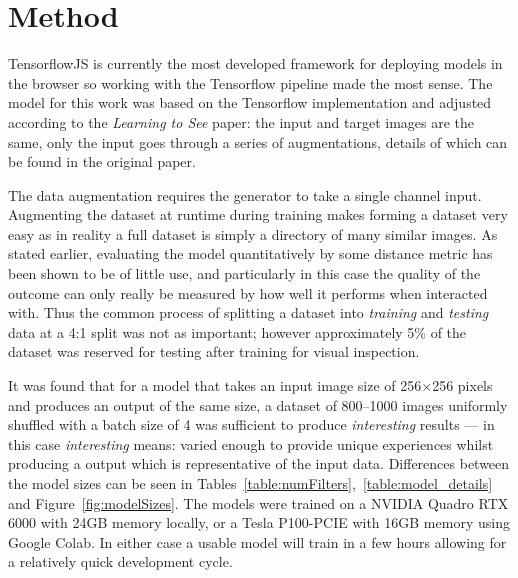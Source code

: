 \documentclass{article}
\begin{document}
\section{Method}
TensorflowJS is currently the most developed framework for deploying models in the browser so working with the Tensorflow pipeline made the most sense. The model for this work was based on the Tensorflow implementation\cite{tf_p2p} and adjusted according to the \textit{Learning to See} paper: the input and target images are the same, only the input goes through a series of augmentations, details of which can be found in the original paper\cite{2003.00902}.

The data augmentation requires the generator to take a single channel input. Augmenting the dataset at runtime during training makes forming a dataset very easy as in reality a full dataset is simply a directory of many similar images. As stated earlier, evaluating the model quantitatively by some distance metric has been shown to be of little use, and particularly in this case the quality of the outcome can only really be measured by how well it performs when interacted with. Thus the common process of splitting a dataset into \textit{training} and \textit{testing} data at a 4:1 split was not as important; however approximately 5\% of the dataset was reserved for testing after training for visual inspection.

It was found that for a model that takes an input image size of 256$\times$256 pixels and produces an output of the same size, a dataset of 800--1000 images uniformly shuffled with a batch size of 4 was sufficient to produce \textit{interesting} results --- in this case \textit{interesting} means: varied enough to provide unique experiences whilst producing a output which is representative of the input data. Differences between the model sizes can be seen in Tables~\ref{table:numFilters},~\ref{table:model_details} and Figure~\ref{fig:modelSizes}. The models were trained on a NVIDIA Quadro RTX 6000 with 24GB memory locally, or a Tesla P100-PCIE with 16GB memory using Google Colab. In either case a usable model will train in a few hours allowing for a relatively quick development cycle. %
\end{document}
